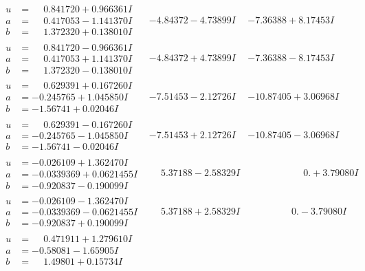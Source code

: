 \documentclass[1p]{elsarticle_modified}
\theoremstyle{definition}
\begin{document}
$$\begin{array}{c|c|c}
\begin{aligned}
u &= \phantom{-}0.841720 + 0.966361 I \\
a &= \phantom{-}0.417053 - 1.141370 I \\
b &= \phantom{-}1.372320 + 0.138010 I\end{aligned}
 & -4.84372 - 4.73899 I & -7.36388 + 8.17453 I \\ \hline\begin{aligned}
u &= \phantom{-}0.841720 - 0.966361 I \\
a &= \phantom{-}0.417053 + 1.141370 I \\
b &= \phantom{-}1.372320 - 0.138010 I\end{aligned}
 & -4.84372 + 4.73899 I & -7.36388 - 8.17453 I \\ \hline\begin{aligned}
u &= \phantom{-}0.629391 + 0.167260 I \\
a &= -0.245765 + 1.045850 I \\
b &= -1.56741 + 0.02046 I\end{aligned}
 & -7.51453 - 2.12726 I & -10.87405 + 3.06968 I \\ \hline\begin{aligned}
u &= \phantom{-}0.629391 - 0.167260 I \\
a &= -0.245765 - 1.045850 I \\
b &= -1.56741 - 0.02046 I\end{aligned}
 & -7.51453 + 2.12726 I & -10.87405 - 3.06968 I \\ \hline\begin{aligned}
u &= -0.026109 + 1.362470 I \\
a &= -0.0339369 + 0.0621455 I \\
b &= -0.920837 - 0.190099 I\end{aligned}
 & \phantom{-}5.37188 - 2.58329 I & \phantom{-0.000000 -}0. + 3.79080 I \\ \hline\begin{aligned}
u &= -0.026109 - 1.362470 I \\
a &= -0.0339369 - 0.0621455 I \\
b &= -0.920837 + 0.190099 I\end{aligned}
 & \phantom{-}5.37188 + 2.58329 I & \phantom{-0.000000 } 0. - 3.79080 I \\ \hline\begin{aligned}
u &= \phantom{-}0.471911 + 1.279610 I \\
a &= -0.58081 - 1.65905 I \\
b &= \phantom{-}1.49801 + 0.15734 I\end{aligned}

\end{array}$$
\end{document}
